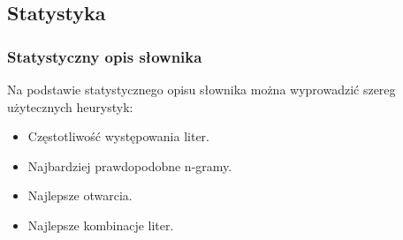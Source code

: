 \documentclass[10pt,a4paper]{beamer}
\begin{document}
\subsection{Statystyka}

\begin{frame}
	\frametitle{Statystyczny opis słownika}
	
	Na podstawie statystycznego opisu słownika można wyprowadzić szereg użytecznych heurystyk:
	
	\begin{itemize}
		\item Częstotliwość występowania liter.
		\item Najbardziej prawdopodobne n-gramy.
		\item Najlepsze otwarcia.
		\item Najlepsze kombinacje liter.
	\end{itemize}
\end{frame}
\end{document}

